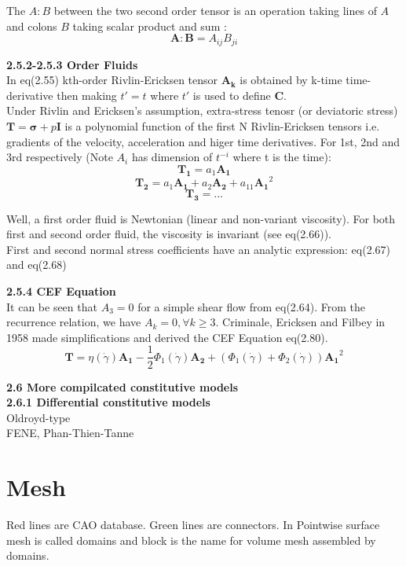 \documentclass[a4paper,10pt]{article}
\begin{document}
The $A:B$ between the two second order tensor is an operation taking lines of $A$ and colons $B$ taking scalar product and sum :
$$
\bm{A}:\bm{B} = A_{ij} B_{ji}
$$ 

{\bf 2.5.2-2.5.3 Order Fluids} \\
In eq(2.55) kth-order Rivlin-Ericksen tensor $\bm{A_k}$ is obtained by k-time time-derivative then making $t'=t $ where $t'$ is used to define $\bm{C}$. \\

Under Rivlin and Ericksen's assumption, extra-stress tenosr (or deviatoric stress) $\bm{T} = \bm{\sigma} + p\bm{I}$  is a polynomial function of the first N Rivlin-Ericksen tensors i.e. gradients of the velocity, acceleration and higer time derivatives. For 1st, 2nd and 3rd respectively (Note $A_i$ has dimension of $t^{-i}$ where t is the time):
$$
\bm{T_1} = a_1 \bm{A_1}
$$
$$
\bm{T_2} = a_1 \bm{A_1} + a_2 \bm{A_2} + a_{11} \bm{A_1}^2
$$
$$
\bm{T_3} = ...
$$

Well, a first order fluid is Newtonian (linear and non-variant viscosity). For both first and second order fluid, the viscosity is invariant (see eq(2.66)). \\

First and second normal stress coefficients have an analytic expression: eq(2.67) and eq(2.68)

{\bf 2.5.4 CEF Equation} \\
It can be seen that $A_3 = 0$ for a simple shear flow from eq(2.64). From the recurrence relation, we have $A_k = 0, \forall k \geq 3$. Criminale, Ericksen and Filbey in 1958 made simplifications and derived the CEF Equation eq(2.80).
$$
\bm{T} = 
\eta(\dot{\gamma})\bm{A_1} 
- \frac{1}{2}\Phi_1(\dot{\gamma})\bm{A_2} + (\Phi_1(\dot{\gamma})+\Phi_2(\dot{\gamma})){\bm{A_1}}^2
$$

\newpage

{\bf 2.6 More compilcated constitutive models} \\
{\bf 2.6.1 Differential constitutive models} \\
Oldroyd-type \\
FENE, Phan-Thien-Tanne 


\section{Mesh}

Red lines are CAO database. Green lines are connectors. In Pointwise surface mesh is called domains and block is the name for volume mesh assembled by domains.
\end{document}
